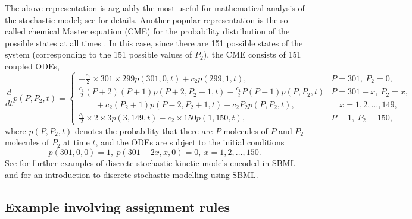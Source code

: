 The above representation is arguably the most useful for
mathematical analysis of the stochastic model; see \cite{ball:2006} for
details. Another popular representation is the so-called chemical
Master equation (CME) for the probability distribution of the possible
states at all times \citep{gillespie:1992}. In this case, since there are
151 possible states of the system (corresponding to the 151
possible values of $P_2$), the CME consists of 151 coupled
ODEs,
\[
\frac{d}{dt}p(P,P_2,t) =
\left\{
\begin{array}{ll}
\displaystyle-\frac{c_1}{2}\times 301\times 299p(301,0,t)+c_2p(299,1,t),
&P=301,\ P_2=0,\\
\displaystyle\frac{c_1}{2}(P+2)(P+1)p(P+2,P_2-1,t)-\frac{c_1}{2}P(P-1)p(P,P_2,t)&P=301-x,\ P_2=x,\\
\qquad+c_2(P_2+1)p(P-2,P_2+1,t)-c_2P_2p(P,P_2,t),
&\quad x=1,2,\ldots,149,\\
\displaystyle\frac{c_1}{2}\times 2\times 3p(3,149,t)-c_2\times 150p(1,150,t),
&P=1,\ P_2=150,
\end{array}
\right.
\]
where $p(P,P_2,t)$ denotes the probability that there are $P$
molecules of $P$ and $P_2$ molecules of $P_2$ at time $t$, and the
ODEs are subject to the initial conditions
\[
p(301,0,0)=1,\ p(301-2x,x,0)=0,\ x=1,2,\ldots,150.
\]
See \cite{evans:2008} for further examples of discrete stochastic
kinetic models encoded in SBML and \cite{wilkinson_2006} for an
introduction to discrete stochastic modelling using SBML.



\subsection{Example involving assignment rules}
\label{apdx:rules-eg}

